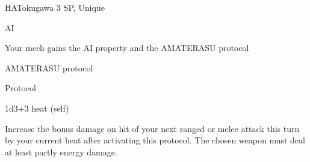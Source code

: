 \begin{mech}{HA}{Tokugawa}
3 SP, Unique

AI

Your mech gains the AI property and the AMATERASU protocol

AMATERASU protocol

Protocol

1d3+3 heat (self)

Increase the bonus damage on hit of your next ranged or melee attack this turn by your current heat after activating this protocol. The chosen weapon must deal at least partly energy damage.
\end{mech}